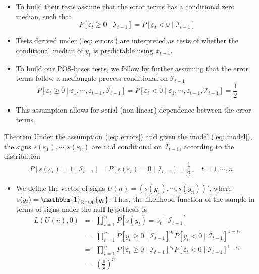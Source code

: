 \documentclass{beamer}
\begin{document}
\begin{frame}
\begin{itemize}
\item {} To build their tests assume that the error terms has a conditional zero median, such that 
\begin{equation}\label{eq: errors}
P[\varepsilon_t\geq0\mid \mathcal{I}_{t-1}]=P[\varepsilon_t<0\mid \mathcal{I}_{t-1}]
\end{equation}
\item{} Tests derived under (\ref{eq: errors}) are interpreted as tests of whether the conditional median of $y_t$ is predictable using $x_{t-1}$. 
\item{} To build our POS-bases tests, we follow by further assuming that the error terms follow a mediangale process conditional on $\mathcal{I}_{t-1}$
\[
P[\varepsilon_t\geq 0 \mid \varepsilon_1,\cdots,\varepsilon_{t-1}, \mathcal{I}_{t-1}]=P[\varepsilon_t< 0 \mid \varepsilon_1,\cdots,\varepsilon_{t-1}, \mathcal{I}_{t-1}]=\frac{1}{2} 
\]
\item{} This assumption allows for serial (non-linear) dependence between the error terms.
\end{itemize}
\end{frame}

\begin{frame}
\begin{block}{Theorem}
Under the assumption (\ref{eq: errors}) and given the model (\ref{eq: model}), the signs $s(\varepsilon_1),\cdots,s(\varepsilon_n)$ are i.i.d conditional on $\mathcal{I}_{t-1}$, according to the distribution
\[
P[s(\varepsilon_t)=1\mid \mathcal{I}_{t-1}]=P[s(\varepsilon_t)=0\mid \mathcal{I}_{t-1}]=\frac{1}{2},\quad t=1,\cdots,n
\]
\end{block}
\end{frame}

\begin{frame}
\begin{itemize}
\item{} We define the vector of signs $U(n)=(s(y_1),\cdots,s(y_n))'$, where $s(y_t)=\mathbbm{1}_{\mathbb{R}^+\cup 0}\{y_t\}$. Thus, the likelihood function of the sample in terms of signs under the null hypothesis is
\begin{eqnarray*}
L(U(n),0)&=&\prod\limits_{t=1}^{n}P[s(y_t)=s_t\mid \mathcal{I}_{t-1}]\\
&=&\prod\limits_{t=1}^{n}P[y_t\geq 0\mid \mathcal{I}_{t-1}]^{s_t}P[y_t< 0\mid \mathcal{I}_{t-1}]^{1-s_t}\\
&=&\prod\limits_{t=1}^{n}P[\varepsilon_t\geq 0\mid \mathcal{I}_{t-1}]^{s_t}P[\varepsilon_t< 0\mid \mathcal{I}_{t-1}]^{1-s_t}\\
&=&\left(\frac{1}{2}\right)^n
\end{eqnarray*}
\end{itemize}
\end{frame}
\end{document}
